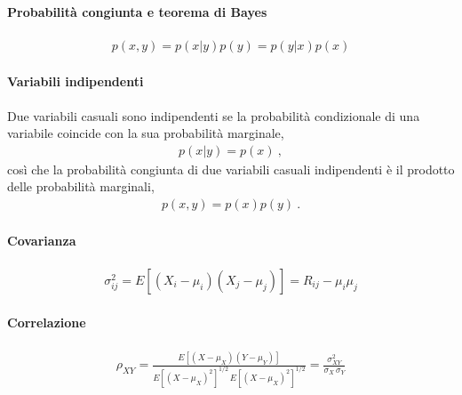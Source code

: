 \documentclass[letterpaper,10pt,italian]{jupyterBook}
\begin{document}
\paragraph{Probabilità congiunta e teorema di Bayes}
\label{\detokenize{ch/statistics/random_variables_discrete:probabilita-congiunta-e-teorema-di-bayes}}\begin{equation*}
\begin{split}p(x,y) = p(x|y)p(y) = p(y|x)p(x)\end{split}
\end{equation*}

\paragraph{Variabili indipendenti}
\label{\detokenize{ch/statistics/random_variables_discrete:variabili-indipendenti}}
\sphinxAtStartPar
Due variabili casuali sono indipendenti se la probabilità condizionale di una variabile coincide con la sua probabilità marginale,
\begin{equation*}
\begin{split}p(x|y) = p(x) \ ,\end{split}
\end{equation*}
\sphinxAtStartPar
così che la probabilità congiunta di due variabili casuali indipendenti è il prodotto delle probabilità marginali,
\begin{equation*}
\begin{split}p(x,y) = p(x)p(y) \ .\end{split}
\end{equation*}

\paragraph{Covarianza}
\label{\detokenize{ch/statistics/random_variables_discrete:covarianza}}\begin{equation*}
\begin{split}\sigma^2_{ij} = E[(X_i-\mu_i)(X_j-\mu_j)] = R_{ij} - \mu_i \mu_j\end{split}
\end{equation*}

\paragraph{Correlazione}
\label{\detokenize{ch/statistics/random_variables_discrete:correlazione}}\begin{equation*}
\begin{split}\rho_{XY} = \frac{E[(X-\mu_X)(Y-\mu_Y)]}{E[(X-\mu_X)^2]^{1/2} \, E[(X-\mu_X)^2]^{1/2}} = \frac{\sigma_{XY}^2}{\sigma_X \, \sigma_Y}\end{split}
\end{equation*}
\sphinxstepscope
\end{document}
